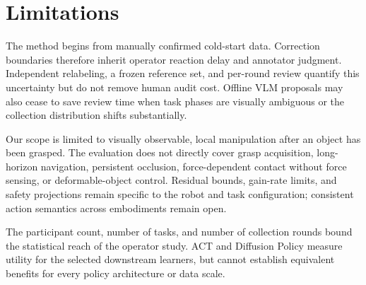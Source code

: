 \section{Limitations}
\label{sec:limitations}

The method begins from manually confirmed cold-start data. Correction
boundaries therefore inherit operator reaction delay and annotator judgment.
Independent relabeling, a frozen reference set, and per-round review quantify
this uncertainty but do not remove human audit cost. Offline VLM proposals may
also cease to save review time when task phases are visually ambiguous or the
collection distribution shifts substantially.

Our scope is limited to visually observable, local manipulation after an object
has been grasped. The evaluation does not directly cover grasp acquisition,
long-horizon navigation, persistent occlusion, force-dependent contact without
force sensing, or deformable-object control. Residual bounds, gain-rate limits,
and safety projections remain specific to the robot and task configuration;
consistent action semantics across embodiments remain open.

The participant count, number of tasks, and number of collection rounds bound
the statistical reach of the operator study. ACT and Diffusion Policy measure
utility for the selected downstream learners, but cannot establish equivalent
benefits for every policy architecture or data scale.
